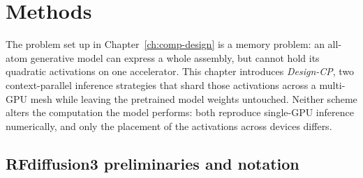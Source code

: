 \chapter{Methods}
\label{ch:methods}


The problem set up in Chapter~\ref{ch:comp-design} is a memory problem: an all-atom
generative model can express a whole assembly, but cannot hold its quadratic
activations on one accelerator. This chapter introduces \emph{Design-CP}, two
context-parallel inference strategies that shard those activations across a
multi-GPU mesh while leaving the pretrained model weights untouched. Neither
scheme alters the computation the model performs: both reproduce single-GPU
inference numerically, and only the placement of the activations across devices
differs.

\section{RFdiffusion3 preliminaries and notation}
\label{sec:rfd3-prelim}

